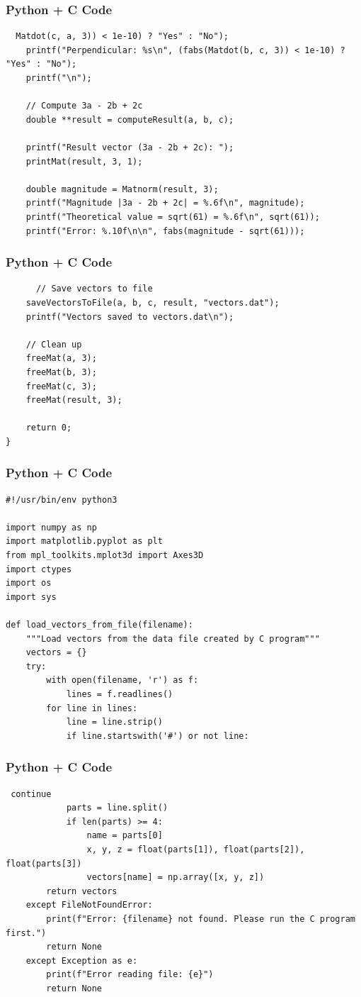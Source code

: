 \documentclass{beamer}
\begin{document}
\begin{frame}[fragile]
    \frametitle{Python + C Code}
    \begin{lstlisting}
  Matdot(c, a, 3)) < 1e-10) ? "Yes" : "No");
    printf("Perpendicular: %s\n", (fabs(Matdot(b, c, 3)) < 1e-10) ? "Yes" : "No");
    printf("\n");
    
    // Compute 3a - 2b + 2c
    double **result = computeResult(a, b, c);
    
    printf("Result vector (3a - 2b + 2c): ");
    printMat(result, 3, 1);
    
    double magnitude = Matnorm(result, 3);
    printf("Magnitude |3a - 2b + 2c| = %.6f\n", magnitude);
    printf("Theoretical value = sqrt(61) = %.6f\n", sqrt(61));
    printf("Error: %.10f\n\n", fabs(magnitude - sqrt(61)));
    \end{lstlisting}
\end{frame}

\begin{frame}[fragile]
    \frametitle{Python + C Code}
    \begin{lstlisting}
      // Save vectors to file
    saveVectorsToFile(a, b, c, result, "vectors.dat");
    printf("Vectors saved to vectors.dat\n");
    
    // Clean up
    freeMat(a, 3);
    freeMat(b, 3);
    freeMat(c, 3);
    freeMat(result, 3);
    
    return 0;
}
    \end{lstlisting}
\end{frame}

\begin{frame}[fragile]
    \frametitle{Python + C Code}
    \begin{lstlisting}
#!/usr/bin/env python3

import numpy as np
import matplotlib.pyplot as plt
from mpl_toolkits.mplot3d import Axes3D
import ctypes
import os
import sys

def load_vectors_from_file(filename):
    """Load vectors from the data file created by C program"""
    vectors = {}
    try:
        with open(filename, 'r') as f:
            lines = f.readlines()
        for line in lines:
            line = line.strip()
            if line.startswith('#') or not line:
\end{lstlisting}
\end{frame}

\begin{frame}[fragile]
    \frametitle{Python + C Code}
    \begin{lstlisting}
 continue
            parts = line.split()
            if len(parts) >= 4:
                name = parts[0]
                x, y, z = float(parts[1]), float(parts[2]), float(parts[3])
                vectors[name] = np.array([x, y, z])
        return vectors
    except FileNotFoundError:
        print(f"Error: {filename} not found. Please run the C program first.")
        return None
    except Exception as e:
        print(f"Error reading file: {e}")
        return None
    \end{lstlisting}
\end{frame}
\end{document}
